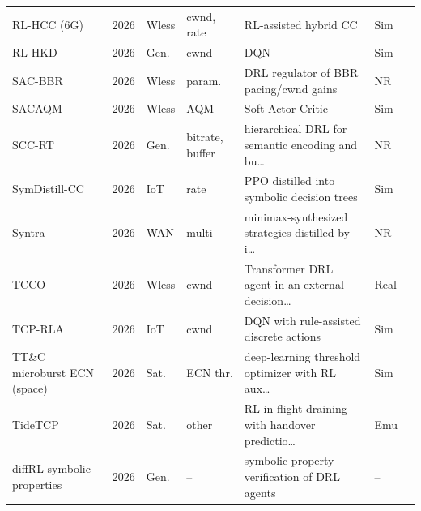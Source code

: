 \begin{small}
\begin{longtable}{@{}L{4.2cm}lllL{4.6cm}ll@{}}
RL-HCC (6G)~\cite{kanojia2026reinforcement} & 2026 & Wless & cwnd, rate & RL-assisted hybrid CC & Sim &  \\
RL-HKD~\cite{aoki2026performance} & 2026 & Gen. & cwnd & DQN & Sim &  \\
SAC-BBR~\cite{li2026sac} & 2026 & Wless & param. & DRL regulator of BBR pacing/cwnd gains & NR &  \\
SACAQM~\cite{qian2026sacaqm} & 2026 & Wless & AQM & Soft Actor-Critic & Sim &  \\
SCC-RT~\cite{guo2026deep} & 2026 & Gen. & bitrate, buffer & hierarchical DRL for semantic encoding and bu… & NR &  \\
SymDistill-CC~\cite{lu2026wapi} & 2026 & IoT & rate & PPO distilled into symbolic decision trees & Sim &  \\
Syntra~\cite{pan2026syntra} & 2026 & WAN & multi & minimax-synthesized strategies distilled by i… & NR &  \\
TCCO~\cite{zhang2026transformer} & 2026 & Wless & cwnd & Transformer DRL agent in an external decision… & Real &  \\
TCP-RLA~\cite{li2026lightweight} & 2026 & IoT & cwnd & DQN with rule-assisted discrete actions & Sim &  \\
TT\&C microburst ECN (space)~\cite{zhang2026collaborative} & 2026 & Sat. & ECN thr. & deep-learning threshold optimizer with RL aux… & Sim &  \\
TideTCP~\cite{li2026tidetcp} & 2026 & Sat. & other & RL in-flight draining with handover predictio… & Emu &  \\
diffRL symbolic properties~\cite{zangooei2026analyzing} & 2026 & Gen. & -- & symbolic property verification of DRL agents & -- &  \\
\end{longtable}
\end{small}
